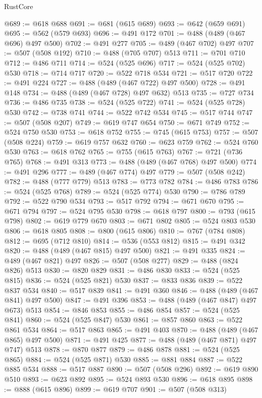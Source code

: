 \begin{lexlean}{RustCore}
\begin{coremodule}
@689 := @618 @688
@691 := @681 (@615 @689)
@693 := @642 (@659 @691)
@695 := @562 (@579 @693)
@696 := @491 @172
@701 := @488 (@489 (@467 @696) @497 @500)
@702 := @491 @277
@705 := @489 (@467 @702) @497
@707 := @507 (@508 @192)
@710 := @488 (@705 @707) @513
@711 := @701 @710
@712 := @486 @711
@714 := @524 (@525 @696)
@717 := @524 (@525 @702) @530
@718 := @714 @717
@720 := @522 @718 @534
@721 := @517 @720
@722 := @491 @224
@727 := @488 (@489 (@467 @722) @497 @500)
@728 := @491 @148
@734 := @488 (@489 (@467 @728) @497 @632) @513
@735 := @727 @734
@736 := @486 @735
@738 := @524 (@525 @722)
@741 := @524 (@525 @728) @530
@742 := @738 @741
@744 := @522 @742 @534
@745 := @517 @744
@747 := @507 (@508 @207)
@749 := @619 @747 @654
@750 := @671 @749
@752 := @524 @750 @530
@753 := @618 @752
@755 := @745 (@615 @753)
@757 := @507 (@508 @224)
@759 := @619 @757 @632
@760 := @623 @759
@762 := @524 @760 @530
@763 := @618 @762
@765 := @755 (@615 @763)
@767 := @721 (@736 @765)
@768 := @491 @313
@773 := @488 (@489 (@467 @768) @497 @500)
@774 := @491 @296
@777 := @489 (@467 @774) @497
@779 := @507 (@508 @242)
@782 := @488 (@777 @779) @513
@783 := @773 @782
@784 := @486 @783
@786 := @524 (@525 @768)
@789 := @524 (@525 @774) @530
@790 := @786 @789
@792 := @522 @790 @534
@793 := @517 @792
@794 := @671 @670
@795 := @671 @794
@797 := @524 @795 @530
@798 := @618 @797
@800 := @793 (@615 @798)
@802 := @619 @779 @670
@803 := @671 @802
@805 := @524 @803 @530
@806 := @618 @805
@808 := @800 (@615 @806)
@810 := @767 (@784 @808)
@812 := @695 (@712 @810)
@814 := @536 (@553 @812)
@815 := @491 @342
@820 := @488 (@489 (@467 @815) @497 @500)
@821 := @491 @335
@824 := @489 (@467 @821) @497
@826 := @507 (@508 @277)
@829 := @488 (@824 @826) @513
@830 := @820 @829
@831 := @486 @830
@833 := @524 (@525 @815)
@836 := @524 (@525 @821) @530
@837 := @833 @836
@839 := @522 @837 @534
@840 := @517 @839
@841 := @491 @360
@846 := @488 (@489 (@467 @841) @497 @500)
@847 := @491 @396
@853 := @488 (@489 (@467 @847) @497 @673) @513
@854 := @846 @853
@855 := @486 @854
@857 := @524 (@525 @841)
@860 := @524 (@525 @847) @530
@861 := @857 @860
@863 := @522 @861 @534
@864 := @517 @863
@865 := @491 @403
@870 := @488 (@489 (@467 @865) @497 @500)
@871 := @491 @425
@877 := @488 (@489 (@467 @871) @497 @747) @513
@878 := @870 @877
@879 := @486 @878
@881 := @524 (@525 @865)
@884 := @524 (@525 @871) @530
@885 := @881 @884
@887 := @522 @885 @534
@888 := @517 @887
@890 := @507 (@508 @296)
@892 := @619 @890 @510
@893 := @623 @892
@895 := @524 @893 @530
@896 := @618 @895
@898 := @888 (@615 @896)
@899 := @619 @707
@901 := @507 (@508 @313)

\end{coremodule}
\end{lexlean}
